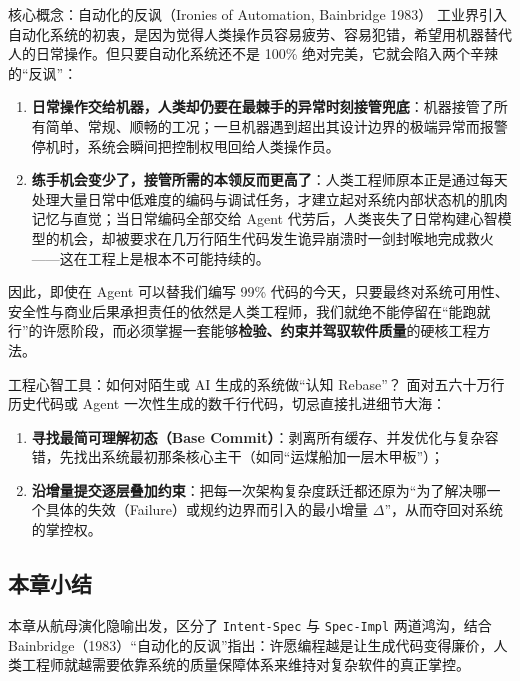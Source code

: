 \documentclass[a4paper]{article}
\begin{document}
\begin{importantbox}{核心概念：自动化的反讽（Ironies of Automation, Bainbridge 1983）}
工业界引入自动化系统的初衷，是因为觉得人类操作员容易疲劳、容易犯错，希望用机器替代人的日常操作。但只要自动化系统还不是 100\% 绝对完美，它就会陷入两个辛辣的“反讽”：
\begin{enumerate}
    \item \textbf{日常操作交给机器，人类却仍要在最棘手的异常时刻接管兜底}：机器接管了所有简单、常规、顺畅的工况；一旦机器遇到超出其设计边界的极端异常而报警停机时，系统会瞬间把控制权甩回给人类操作员。
    \item \textbf{练手机会变少了，接管所需的本领反而更高了}：人类工程师原本正是通过每天处理大量日常中低难度的编码与调试任务，才建立起对系统内部状态机的肌肉记忆与直觉；当日常编码全部交给 Agent 代劳后，人类丧失了日常构建心智模型的机会，却被要求在几万行陌生代码发生诡异崩溃时一剑封喉地完成救火——这在工程上是根本不可能持续的。
\end{enumerate}
\end{importantbox}

因此，即使在 Agent 可以替我们编写 99\% 代码的今天，只要最终对系统可用性、安全性与商业后果承担责任的依然是人类工程师，我们就绝不能停留在“能跑就行”的许愿阶段，而必须掌握一套能够\textbf{检验、约束并驾驭软件质量}的硬核工程方法。

\begin{knowledgebox}{工程心智工具：如何对陌生或 AI 生成的系统做“认知 Rebase”？}
面对五六十万行历史代码或 Agent 一次性生成的数千行代码，切忌直接扎进细节大海：
\begin{enumerate}
    \item \textbf{寻找最简可理解初态（Base Commit）}：剥离所有缓存、并发优化与复杂容错，先找出系统最初那条核心主干（如同“运煤船加一层木甲板”）；
    \item \textbf{沿增量提交逐层叠加约束}：把每一次架构复杂度跃迁都还原为“为了解决哪一个具体的失效（Failure）或规约边界而引入的最小增量 $\Delta$”，从而夺回对系统的掌控权。
\end{enumerate}
\end{knowledgebox}

\subsection{本章小结}

本章从航母演化隐喻出发，区分了 \texttt{Intent-Spec} 与 \texttt{Spec-Impl} 两道鸿沟，结合 Bainbridge（1983）“自动化的反讽”指出：许愿编程越是让生成代码变得廉价，人类工程师就越需要依靠系统的质量保障体系来维持对复杂软件的真正掌控。
\end{document}
